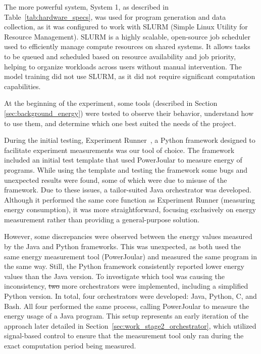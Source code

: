 The more powerful system, System 1, as described in Table~\ref{tab:hardware_specs}, was used for program generation and data collection, as it was configured to work with SLURM (Simple Linux Utility for Resource Management). SLURM is a highly scalable, open-source job scheduler used to efficiently manage compute resources on shared systems. It allows tasks to be queued and scheduled based on resource availability and job priority, helping to organize workloads across users without manual intervention. The model training did not use SLURM, as it did not require significant computation capabilities.

At the beginning of the experiment, some tools (described in Section \ref{sec:background_energy}) were tested to observe their behavior, understand how to use them, and determine which one best suited the needs of the project.

During the initial testing, Experiment Runner~\cite{S2_Group_Experiment_Runner}, a Python framework designed to facilitate experiment measurements was our tool of choice. The framework included an initial test template that used PowerJoular to measure energy of programs. While using the template and testing the framework some bugs and unexpected results were found, some of which were due to misuse of the framework.
Due to these issues, a tailor-suited Java orchestrator was developed. Although it performed the same core function as Experiment Runner (measuring energy consumption), it was more straightforward, focusing exclusively on energy measurement rather than providing a general-purpose solution.

However, some discrepancies were observed between the energy values measured by the Java and Python frameworks. This was unexpected, as both used the same energy measurement tool (PowerJoular) and measured the same program in the same way. Still, the Python framework consistently reported lower energy values than the Java version.
To investigate which tool was causing the inconsistency, \st{two}  more orchestrators were implemented, including a simplified Python version. In total, four orchestrators were developed: Java, Python, C, and Bash. All four performed the same process, calling PowerJoular to measure the energy usage of a Java program.
This setup represents an early iteration of the approach later detailed in Section~\ref{sec:work_stage2_orchestrator}, which utilized signal-based control to ensure that the measurement tool only ran during the exact computation period being measured.

